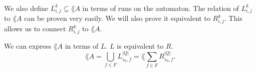 \documentclass[11pt,a4paper,oneside]{book}
\begin{document}
                    \paragraph{}
                        We also define $L^k_{i,j} \subseteq \lang{A}$ in terms of runs on the automaton. 
                        The relation of $L^k_{i,j}$ to $\lang{A}$ can be proven very easily.
                        We will also prove it equivalent to $R^k_{i,j}$.
                        This allows us to connect $R^k_{i,j}$ to $\lang{A}$.
                        \vspace{-0.3cm} 
                    
                    \begin{theorem} We can express $\lang{A}$ in terms of $L$. $L$ is equivalent to $R$.
                        \label{LR}
                        \[
                             \lang{A} = \bigcup\limits_{f \in F} L^{|Q|}_{s_0, f} = \lang{\sum\limits_{f \in F} R^{|Q|}_{s_0, f}}.
                        \]
                    \end{theorem}
\end{document}

